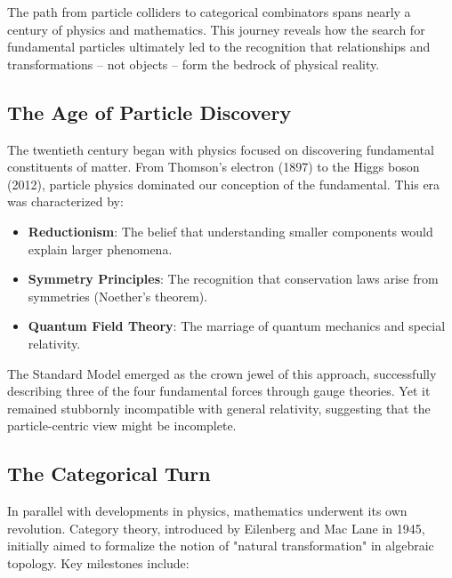 The path from particle colliders to categorical combinators spans nearly a century of physics and mathematics. This journey reveals how the search for fundamental particles ultimately led to the recognition that relationships and transformations -- not objects -- form the bedrock of physical reality.

\subsection{The Age of Particle Discovery}

The twentieth century began with physics focused on discovering fundamental constituents of matter. From Thomson's electron (1897) to the Higgs boson (2012), particle physics dominated our conception of the fundamental. This era was characterized by:

\begin{itemize}[leftmargin=*]
\item \textbf{Reductionism}: The belief that understanding smaller components would explain larger phenomena.
\item \textbf{Symmetry Principles}: The recognition that conservation laws arise from symmetries (Noether's theorem).
\item \textbf{Quantum Field Theory}: The marriage of quantum mechanics and special relativity.
\end{itemize}

The Standard Model emerged as the crown jewel of this approach, successfully describing three of the four fundamental forces through gauge theories. Yet it remained stubbornly incompatible with general relativity, suggesting that the particle-centric view might be incomplete.

\subsection{The Categorical Turn}

In parallel with developments in physics, mathematics underwent its own revolution. Category theory, introduced by Eilenberg and Mac Lane in 1945, initially aimed to formalize the notion of "natural transformation" in algebraic topology. Key milestones include:

